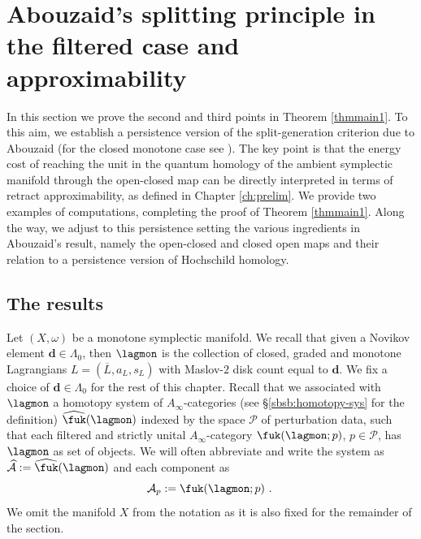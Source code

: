 
\newpage

\section{Abouzaid's splitting principle in the filtered case and approximability} \label{sec:split-app}
In this section we prove the second and third points in Theorem \ref{thmmain1}. To this aim, we establish a persistence version of the split-generation criterion due to Abouzaid \cite{Ab:geom-crit} (for the closed monotone case see \cite{she:fanofuk}). The key point is that the energy cost of reaching the unit in the quantum homology of the ambient symplectic manifold through the open-closed map can be directly interpreted in terms of  retract  approximability, as defined in Chapter \ref{ch:prelim}.  We provide two examples of computations, completing the proof of Theorem \ref{thmmain1}. 
Along the way,  we adjust to this persistence setting the various
ingredients in Abouzaid's result, namely the open-closed and closed open maps and their relation to a persistence version of Hochschild homology.



\subsection{The results}
Let $(X,\omega)$ be a monotone symplectic manifold. We recall that given a Novikov element $\mathbf{d} \in \Lambda_0$, then $\lagmon$ is the collection of closed, graded and monotone Lagrangians $L = (\overline{L}, a_L, s_L)$ with Maslov-$2$ disk count equal to $\mathbf{d}$. We fix a choice of $\mathbf{d}\in \Lambda_0$ for the rest of this chapter. Recall that we associated with $\lagmon$ a homotopy system of $A_\infty$-categories (see \S\ref{sbsb:homotopy-sys} for the definition) $\widehat{\fuk}(\lagmon)$ indexed by the space $\mathcal{P}$ of perturbation data, such that each filtered and strictly unital $A_\infty$-category $\fuk(\lagmon;p)$, $p\in \mathcal{P}$, has $\lagmon$ as set of objects. We will often abbreviate and write the system as $\widehat{\mathcal{A}}:=\widehat{\fuk}(\lagmon)$ and each component as 
$$\mathcal{A}_p:= \fuk(\lagmon;p)~.~$$ We omit the manifold $X$ from the notation as it is also fixed for the remainder of the section.

